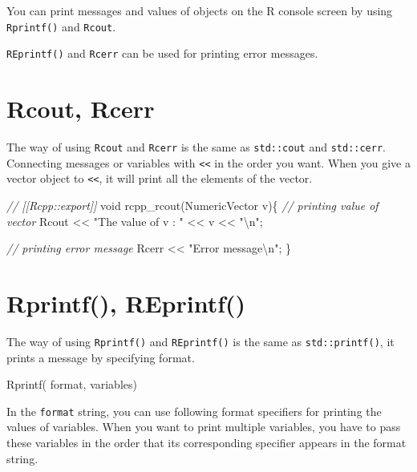 \documentclass[]{book}
\newenvironment{Shaded}{\begin{snugshade}}{\end{snugshade}}
\newcommand{\CommentTok}[1]{\textcolor[rgb]{0.56,0.35,0.01}{\textit{#1}}}
\newcommand{\DataTypeTok}[1]{\textcolor[rgb]{0.13,0.29,0.53}{#1}}
\newcommand{\NormalTok}[1]{#1}
\newcommand{\SpecialCharTok}[1]{\textcolor[rgb]{0.00,0.00,0.00}{#1}}
\newcommand{\StringTok}[1]{\textcolor[rgb]{0.31,0.60,0.02}{#1}}
\begin{document}
You can print messages and values of objects on the R console screen by using \texttt{Rprintf()} and \texttt{Rcout}.

\texttt{REprintf()} and \texttt{Rcerr} can be used for printing error messages.

\hypertarget{rcout-rcerr}{%
\section{Rcout, Rcerr}\label{rcout-rcerr}}

The way of using \texttt{Rcout} and \texttt{Rcerr} is the same as \texttt{std::cout} and \texttt{std::cerr}. Connecting messages or variables with \texttt{\textless{}\textless{}} in the order you want. When you give a vector object to \texttt{\textless{}\textless{}}, it will print all the elements of the vector.

\begin{Shaded}
\begin{Highlighting}[]
\CommentTok{// [[Rcpp::export]]}
\DataTypeTok{void}\NormalTok{ rcpp_rcout(NumericVector v)\{}
  \CommentTok{// printing value of vector}
\NormalTok{  Rcout << }\StringTok{"The value of v : "}\NormalTok{ << v << }\StringTok{"}\SpecialCharTok{\textbackslash{}n}\StringTok{"}\NormalTok{;}

  \CommentTok{// printing error message}
\NormalTok{  Rcerr << }\StringTok{"Error message}\SpecialCharTok{\textbackslash{}n}\StringTok{"}\NormalTok{;}
\NormalTok{\}}
\end{Highlighting}
\end{Shaded}

\hypertarget{rprintf-reprintf}{%
\section{Rprintf(), REprintf()}\label{rprintf-reprintf}}

The way of using \texttt{Rprintf()} and \texttt{REprintf()} is the same as \texttt{std::printf()}, it prints a message by specifying format.

\begin{Shaded}
\begin{Highlighting}[]
\NormalTok{Rprintf( format, variables)}
\end{Highlighting}
\end{Shaded}

In the \texttt{format} string, you can use following format specifiers for printing the values of variables. When you want to print multiple variables, you have to pass these variables in the order that its corresponding specifier appears in the format string.
\end{document}
